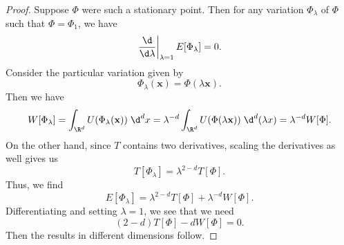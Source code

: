 \documentclass[a4paper]{article}
\begin{document}
\begin{proof}
  Suppose $\Phi$ were such a stationary point. Then for any variation $\Phi_\lambda$ of $\Phi$ such that $\Phi = \Phi_1$, we have
  \[
    \left.\frac{\d}{\d \lambda}\right|_{\lambda = 1}E[\Phi_\lambda] = 0.
  \]
  Consider the particular variation given by
  \[
    \Phi_\lambda(\mathbf{x}) = \Phi(\lambda \mathbf{x}).
  \]
  Then we have
  \[
    W[\Phi_\lambda] = \int_{\R^d} U(\Phi_\lambda(\mathbf{x})) \;\d^d x = \lambda^{-d} \int_{\R^d} U(\Phi(\lambda \mathbf{x}))\;\d^d (\lambda x) = \lambda^{-d} W[\Phi].
  \]
  On the other hand, since $T$ contains two derivatives, scaling the derivatives as well gives us
  \[
    T[\Phi_\lambda] = \lambda^{2 -d} T[\Phi].
  \]
  Thus, we find
  \[
    E[\Phi_\lambda] = \lambda^{2 - d}T[\Phi] + \lambda^{-d} W[\Phi].
  \]
  Differentiating and setting $\lambda = 1$, we see that we need
  \[
    (2 - d) T[\Phi] - d W[\Phi] = 0.
  \]
  Then the results in different dimensions follow.
\end{proof}
%
%
%
\end{document}
